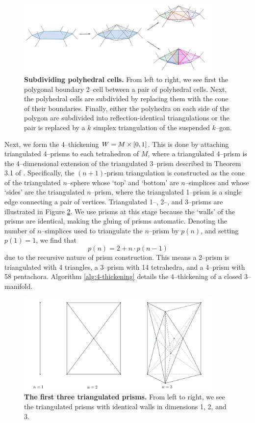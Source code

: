 \begin{figure}[h!]
	\centering
	\includegraphics[width=0.9\textwidth]{figures/subdivide-polyhedra.png}
	\caption{
		\textbf{Subdividing polyhedral cells.}
		From left to right, we see first the polygonal boundary 2--cell between a pair of polyhedral cells.
		Next, the polyhedral cells are subdivided by replacing them with the cone of their boundaries.
		Finally, either the polyhedra on each side of the polygon are subdivided into reflection-identical triangulations or the pair is replaced by a $k$ simplex triangulation  of the suspended $k$--gon.
	}
	\label{fig:subdivide-polyhedra}
\end{figure}


Next, we form the 4--thickening $W=M\times[0,1]$.
This is done by attaching triangulated 4--prisms to each tetrahedron of $M$, where a triangulated 4--prism is the 4--dimensional extension of the triangulated 3--prism described in Theorem 3.1 of \cite{burton2011simplification}.
Specifically, the $(n+1)$-prism triangulation is constructed as the cone of the triangulated $n$--sphere whose `top' and `bottom' are $n$--simplices and whose `sides' are the triangulated $n$--prism, where the triangulated 1--prism is a single edge connecting a pair of vertices.
Triangulated 1--, 2--, and 3--prisms are illustrated in Figure \ref{fig:prisms}.
We use prisms at this stage because the `walls' of the prisms are identical, making the gluing of prisms automatic.
Denoting the number of $n$--simplices used to triangulate the $n$--prism by $p(n)$, and setting $p(1)=1$, we find that
\[
	p(n) = 2 + n\cdot p(n-1)
\]
due to the recursive nature of prism construction.
This means a 2--prism is triangulated with 4 triangles, a 3--prism with 14 tetrahedra, and a 4--prism with 58 pentachora.
Algorithm \ref{alg:4-thickening} details the 4--thickening of a closed 3--manifold.

\begin{figure}[h!]
	\centering
	\includegraphics[width=0.9\textwidth]{figures/prisms.png}
	\caption{
		\textbf{The first three triangulated prisms.}
		From left to right, we see the triangulated prisms with identical walls in dimensions 1, 2, and 3.
	}
	\label{fig:prisms}
\end{figure}

